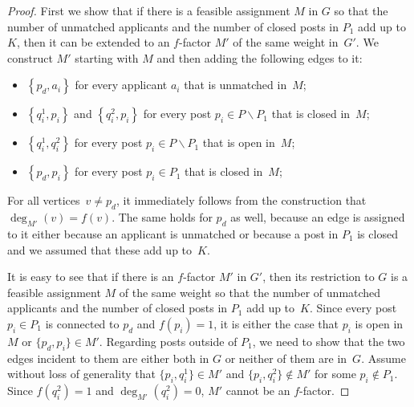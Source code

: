 \documentclass{llncs}
\newcommand{\set}[1]{\left\{#1\right\}}
\begin{document}
\begin{proof}
First we show that if there is a feasible assignment $M$ in $G$ so that the number of unmatched applicants and the number of closed posts in $P_1$ add up to $K$, then it can be extended to an $f$-factor $M'$ of the same weight in~$G'$. We construct $M'$ starting with $M$ and then adding the following edges to it:

\begin{itemize}
 \item $\set{p_d,a_i}$ for every applicant $a_i$ that is unmatched in~$M$;
 \item $\set{q_i^1,p_i}$ and $\set{q_i^2,p_i}$ for every post $p_i\in P\backslash P_1$ that is closed in~$M$;
 \item $\set{q_i^1,q_i^2}$ for every post $p_i\in P\backslash P_1$ that is open in~$M$;
 \item $\set{p_d,p_i}$ for every post $p_i \in P_1$ that is closed in~$M$;
\end{itemize}

For all vertices~$v \neq p_d$, it immediately follows from the construction that $\deg_{M'}(v) = f(v)$. The same holds for $p_d$ as well, because an edge is assigned to it either because an applicant is unmatched or because a post in $P_1$ is closed and we assumed that these add up to~$K$. 

It is easy to see that if there is an $f$-factor $M'$ in $G'$, then its restriction to $G$ is a feasible assignment $M$ of the same weight so that the number of unmatched applicants and the number of closed posts in $P_1$ add up to~$K$. Since every post $p_i \in P_1$ is connected to $p_d$ and $f(p_i) = 1$, it is either the case that $p_i$ is open in $M$ or $\{p_d,p_i\}\in M'$. Regarding posts outside of $P_1$, we need to show that the two edges incident to them are either both in $G$ or neither of them are in~$G$. Assume without loss of generality that $\{p_i,q_i^1\}\in M'$ and $\{p_i,q_i^2\}\notin M'$ for some $p_i \notin P_1$. Since $f(q_i^2) = 1$ and $\deg_{M'}(q_i^2) = 0$, $M'$ cannot be an $f$-factor.


\end{proof}
\end{document}
